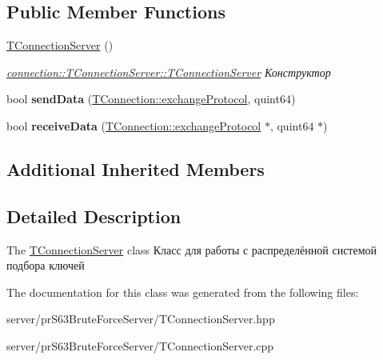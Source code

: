 \subsection*{Public Member Functions}
\begin{DoxyCompactItemize}
\item 
\mbox{\label{classconnection_1_1_t_connection_server_a606ed5e1fd8c97a795abe9e54be5bdeb}} 
\hyperlink{classconnection_1_1_t_connection_server_a606ed5e1fd8c97a795abe9e54be5bdeb}{T\+Connection\+Server} ()
\begin{DoxyCompactList}\small\item\em \hyperlink{classconnection_1_1_t_connection_server_a606ed5e1fd8c97a795abe9e54be5bdeb}{connection\+::\+T\+Connection\+Server\+::\+T\+Connection\+Server} Конструктор \end{DoxyCompactList}\item 
\mbox{\label{classconnection_1_1_t_connection_server_a481b658bc12f7bb0b5fee3ccef2937ff}} 
bool {\bfseries send\+Data} (\hyperlink{classconnection_1_1_t_connection_a3550181cb2fa72eccfa55d23f45cea34}{T\+Connection\+::exchange\+Protocol}, quint64)
\item 
\mbox{\label{classconnection_1_1_t_connection_server_a40b7cdfa826bf501fdb165e965511736}} 
bool {\bfseries receive\+Data} (\hyperlink{classconnection_1_1_t_connection_a3550181cb2fa72eccfa55d23f45cea34}{T\+Connection\+::exchange\+Protocol} $\ast$, quint64 $\ast$)
\end{DoxyCompactItemize}
\subsection*{Additional Inherited Members}


\subsection{Detailed Description}
The \hyperlink{classconnection_1_1_t_connection_server}{T\+Connection\+Server} class Класс для работы с распределённой системой подбора ключей 

The documentation for this class was generated from the following files\+:\begin{DoxyCompactItemize}
\item 
server/pr\+S63\+Brute\+Force\+Server/T\+Connection\+Server.\+hpp\item 
server/pr\+S63\+Brute\+Force\+Server/T\+Connection\+Server.\+cpp\end{DoxyCompactItemize}
